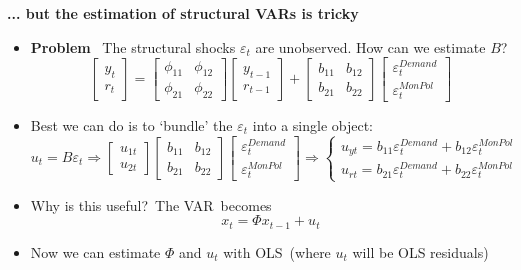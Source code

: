 \begin{frame}
{\textbf{... but the estimation of structural VARs is tricky}}

\begin{itemize}
\item \textbf{Problem} \ The structural shocks $\varepsilon _{t}$ are
unobserved. How can we estimate $B$? 
\begin{equation*}
\begin{bmatrix}
y_{t} \\ 
r_{t}%
\end{bmatrix}%
=%
\begin{bmatrix}
\phi _{11} & \phi _{12} \\ 
\phi _{21} & \phi _{22}%
\end{bmatrix}%
\begin{bmatrix}
y_{t-1} \\ 
r_{t-1}%
\end{bmatrix}%
+%
\begin{bmatrix}
b_{11} & b_{12} \\ 
b_{21} & b_{22}%
\end{bmatrix}%
\begin{bmatrix}
\varepsilon _{t}^{Demand} \\ 
\varepsilon _{t}^{MonPol}%
\end{bmatrix}%
\end{equation*}%
\pause

\item Best we can do is to `bundle' the $\varepsilon _{t}$ into a single
object: 
\begin{equation*}
u_{t}=B\varepsilon _{t}\Rightarrow 
\begin{bmatrix}
u_{1t} \\ 
u_{2t}%
\end{bmatrix}%
\left[ 
\begin{array}{cc}
b_{11} & b_{12} \\ 
b_{21} & b_{22}%
\end{array}%
\right] 
\begin{bmatrix}
\varepsilon _{t}^{Demand} \\ 
\varepsilon _{t}^{MonPol}%
\end{bmatrix}%
\Rightarrow \left\{ 
\begin{array}{c}
u_{yt}=b_{11}\varepsilon _{t}^{Demand}+b_{12}\varepsilon _{t}^{MonPol} \\ 
u_{rt}=b_{21}\varepsilon _{t}^{Demand}+b_{22}\varepsilon _{t}^{MonPol}%
\end{array}%
\right.
\end{equation*}

\item Why is this useful?\ The VAR\ becomes%
\begin{equation*}
x_{t}=\Phi x_{t-1}+u_{t}
\end{equation*}%
\vspace{-.3cm}

\item Now we can estimate $\Phi $ and $u_{t}$ with OLS\ (where $u_{t}$ will
be OLS residuals)
\end{itemize}
\end{frame}

